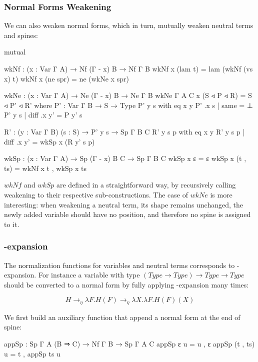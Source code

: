 \subsubsection*{Normal Forms Weakening}

We can also weaken normal forms, which in turn, mutually weaken neutral terms and spines:

\begin{code}[hide]
mutual
\end{code}

\begin{code}
  wkNf : (x : Var Γ A) → Nf (Γ - x) B → Nf Γ B
  wkNf x (lam t) = lam (wkNf (vs x) t)
  wkNf x (ne spr) = ne (wkNe x spr)

  wkNe : (x : Var Γ A) → Ne (Γ - x) B → Ne Γ B
  wkNe {Γ} {A} {C} x (S ◃ P ◃ R) = S ◃ P' ◃ R'
    where
    P' : Var Γ B → S → Type
    P' y  s with eq x y
    P' .x s | same = ⊥
    P' y  s | diff .x y' = P y' s

    R' : (y : Var Γ B) (s : S) → P' y s → Sp Γ B C
    R' y s p with eq x y
    R' y s p | diff .x y' = wkSp x (R y' s p)

  wkSp : (x : Var Γ A) → Sp (Γ - x) B C → Sp Γ B C
  wkSp x ε = ε
  wkSp x (t , ts) = wkNf x t , wkSp x ts
\end{code}

$wkNf$ and $wkSp$ are defined in a straightforward way, by recursively calling weakening to their respective sub-constructions. The case of $wkNe$ is more interesting: when weakening a neutral term, its shape remains unchanged, the newly added variable should have no position, and therefore no spine is assigned to it.

\subsubsection*{\eta-expansion}

The normalization functions for variables and neutral terms corresponds to \eta-expansion. For instance a variable with type $(Type \to Type) \to Type \to Type$ should be converted to a normal form by fully applying \eta-expansion many times:

\[ H \to_{\eta} \lambda F. H (F) \to_{\eta} \lambda X. \lambda F. H (F) (X) \]

We first build an auxiliary function that append a normal form at the end of spine:

\begin{code}
appSp : Sp Γ A (B ⇒ C) → Nf Γ B → Sp Γ A C
appSp ε u = u , ε
appSp (t , ts) u = t , appSp ts u
\end{code}

